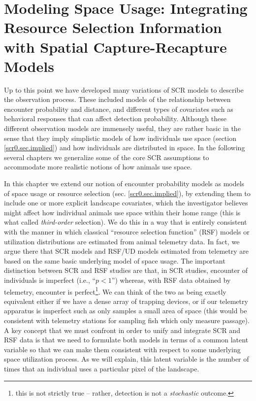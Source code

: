 \chapter{
Modeling Space Usage:
Integrating Resource Selection Information with
Spatial Capture-Recapture
  Models}

\label{chapt.rsf}


\vspace{.3in}

Up to this point we have developed many variations of
SCR models to describe the observation process. 
These included models of the relationship between encounter
probability and distance, and different types of covariates such as 
behavioral responses 
that can affect detection
probability. 
Although these different observation models are immensely useful, they
are rather basic in the sense
that they imply simplistic models of how individuals use space
(section \ref{scr0.sec.implied}) and how individuals are distributed
in space.  In the following several chapters we generalize some of the
core SCR assumptions to accommodate more realistic notions of how
animals use space.

In this chapter we extend our notion of encounter probability models
as models of space usage or resource selection
(sec. \ref{scr0.sec.implied}), by extending them to include one or
more explicit landscape covariates, which the investigator believes
might affect how individual animals use space within their home range
(this is what \citep{johnson:1980} called {\it third-order} selection). We do this in a way
that is entirely consistent with the manner in which classical
``resource selection function'' (RSF) models \citep{manly_etal:2002} or utilization
distributions \citep{worton:1989, fieberg:2005, fieberg:2007}are estimated from animal
telemetry data.  In fact, we argue there that SCR models and RSF/UD
models estimated from telemetry are based on the same basic underlying model
of space usage. The important distinction between SCR and RSF studies are
that, in SCR studies, encounter of individuals is imperfect (i.e.,
``$p<1$'') whereas, with RSF data obtained by telemetry, encounter is
perfect\footnote{this is not strictly true -- rather, detection is not
  a {\it stochastic} outcome.}. We can think of the two as being
exactly equivalent either if we have a dense array of trapping
devices, or if our telemetry apparatus is imperfect such as only
samples a small area of space (this would be consistent with telemetry
stations for sampling fish which only measure passage).  A key concept
that we must confront in order to unify and integrate SCR and RSF data
is that we need to formulate both models in terms of a common latent
variable so that we can make them consistent with respect to some
underlying space utilization process. As we will explain, this latent
variable is the number of times that an individual uses a 
particular pixel of the landscape.

